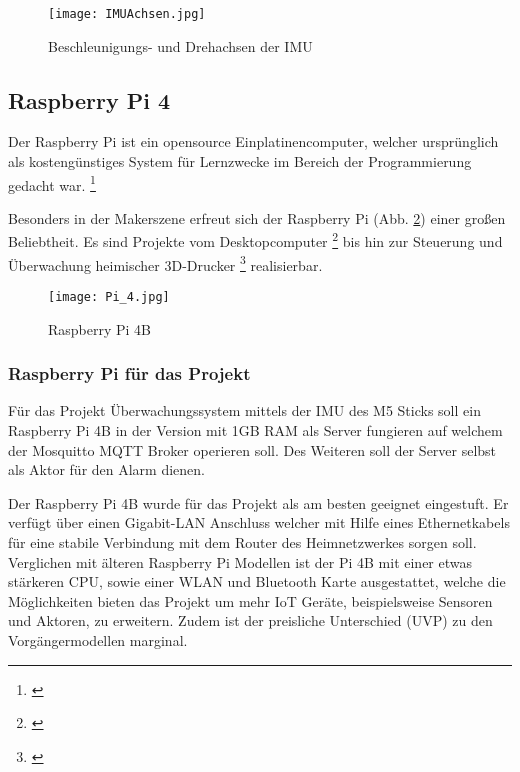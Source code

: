 \begin{figure}[H]	%
\begin{center}
\texttt{[image: IMUAchsen.jpg]}
\caption{Beschleunigungs- und Drehachsen der IMU
\protect\cite{InvenSense.}}
\label{IMUAchsen}
\end{center}
\end{figure}

\newpage

\subsection{Raspberry Pi 4}
Der Raspberry Pi ist ein opensource Einplatinencomputer, welcher ursprünglich als kostengünstiges System für Lernzwecke im Bereich der Programmierung gedacht war. \footnote{\cite{RaspberryPi.20.08.2015}} \par
Besonders in der Makerszene erfreut sich der Raspberry Pi (Abb. \ref{pi_mitgehaeuse}) einer großen Beliebtheit. Es sind Projekte vom Desktopcomputer \footnote{\cite{RaspberryPi.20.08.2015}} bis hin zur Steuerung und Überwachung heimischer 3D-Drucker \footnote{\cite{Hauge.20.04.2022}} realisierbar.\\[3mm]

	\begin{figure}[H]
	\centering
	\texttt{[image: Pi\_4.jpg]}
	\caption{Raspberry Pi 4B}
	\label{pi_mitgehaeuse}
\end{figure}	

\subsubsection{Raspberry Pi für das Projekt}
Für das Projekt Überwachungssystem mittels der IMU des M5 Sticks soll ein 
Raspberry Pi 4B in der Version mit 1GB RAM als Server fungieren auf welchem der Mosquitto MQTT Broker operieren soll. Des Weiteren soll der Server selbst als Aktor für den Alarm dienen.\par

Der Raspberry Pi 4B wurde für das Projekt als am besten geeignet eingestuft. Er verfügt über einen Gigabit-LAN Anschluss welcher mit Hilfe eines Ethernetkabels für eine stabile Verbindung mit dem Router des Heimnetzwerkes sorgen soll. Verglichen mit älteren Raspberry Pi Modellen ist der Pi 4B mit einer etwas stärkeren CPU, sowie einer WLAN und Bluetooth Karte ausgestattet, welche die Möglichkeiten bieten das Projekt um mehr IoT Geräte, beispielsweise Sensoren und Aktoren, zu erweitern. Zudem ist der preisliche Unterschied (UVP) zu den Vorgängermodellen marginal.  

